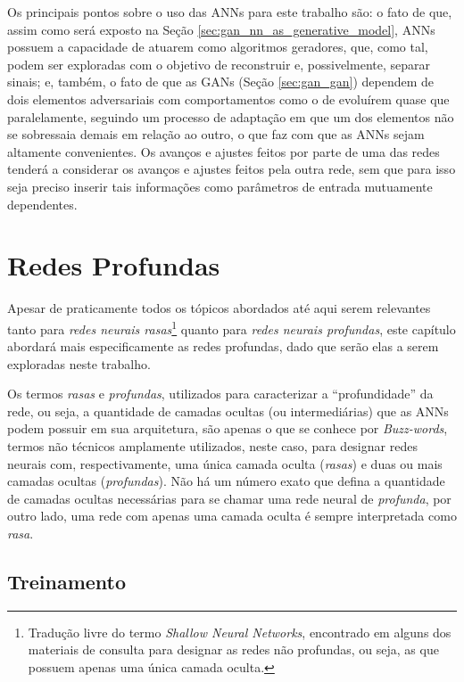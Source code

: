 Os principais pontos sobre o uso das ANNs para este trabalho são: o fato de que, assim como será exposto na Seção \ref{sec:gan_nn_as_generative_model}, ANNs possuem a capacidade de atuarem como algoritmos geradores, que, como tal, podem ser exploradas com o objetivo de reconstruir e, possivelmente, separar sinais; e, também, o fato de que as GANs (Seção \ref{sec:gan_gan}) dependem de dois elementos adversariais com comportamentos como o de evoluírem quase que paralelamente, seguindo um processo de adaptação em que um dos elementos não se sobressaia demais em relação ao outro, o que faz com que as ANNs sejam altamente convenientes. Os avanços e ajustes feitos por parte de uma das redes tenderá a considerar os avanços e ajustes feitos pela outra rede, sem que para isso seja preciso inserir tais informações como parâmetros de entrada mutuamente dependentes.


\section{Redes Profundas}
\label{sec:ann_deep_networks}

Apesar de praticamente todos os tópicos abordados até aqui serem relevantes tanto para \textit{redes neurais rasas}\footnote{Tradução livre do termo \textit{Shallow Neural Networks}, encontrado em alguns dos materiais de consulta para designar as redes não profundas, ou seja, as que possuem apenas uma única camada oculta.} quanto para \textit{redes neurais profundas}, este capítulo abordará mais especificamente as redes profundas, dado que serão elas a serem exploradas neste trabalho.

Os termos \textit{rasas} e \textit{profundas}, utilizados para caracterizar a ``profundidade'' da rede, ou seja, a quantidade de camadas ocultas (ou intermediárias) que as ANNs podem possuir em sua arquitetura, são apenas o que se conhece por \textit{Buzz-words}, termos não técnicos amplamente utilizados, neste caso, para designar redes neurais com, respectivamente, uma única camada oculta (\textit{rasas}) e duas ou mais camadas ocultas (\textit{profundas}). Não há um número exato que defina a quantidade de camadas ocultas necessárias para se chamar uma rede neural de \textit{profunda}, por outro lado, uma rede com apenas uma camada oculta é sempre interpretada como \textit{rasa}.



\subsection{Treinamento}
\label{subsec:ann_training}

